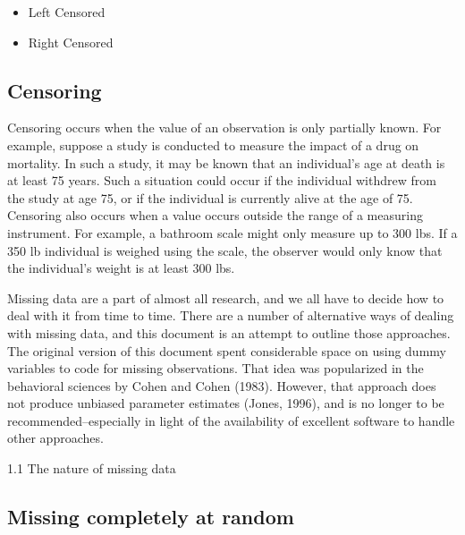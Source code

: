 \begin{itemize}
\item Left Censored
\item Right Censored
\end{itemize}

\subsection{Censoring}
Censoring occurs when the value of an observation is only partially known. 
For example, suppose a study is conducted to measure the impact of a drug on mortality. 
In such a study, it may be known that an individual's age at death is at least 75 years. 
Such a situation could occur if the individual withdrew from the study at age 75, or if the individual is currently 
alive at the age of 75.
Censoring also occurs when a value occurs outside the range of a measuring instrument. 
For example, a bathroom scale might only measure up to 300 lbs. 
If a 350 lb individual is weighed using the scale, the observer would only know that the individual's weight is at 
least 300 lbs.

\newpage

Missing data are a part of almost all research, and we all have to decide how to deal with it from time to time. There are a number of alternative ways of dealing with missing data, and this document is an attempt to outline those approaches. The original version of this document spent considerable space on using dummy variables to code for missing observations. That idea was popularized in the behavioral sciences by Cohen and Cohen (1983). However, that approach does not produce unbiased parameter estimates (Jones, 1996), and is no longer to be recommended--especially in light of the availability of excellent software to handle other approaches. 

1.1 The nature of missing data

\subsection{Missing completely at random}


